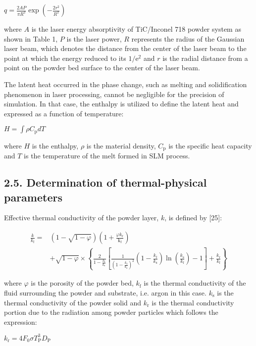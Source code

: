 \documentclass[10pt]{article}
\begin{document}
$q=\frac{2 A P}{\pi R^{2}} \exp \left(-\frac{2 r^{2}}{R^{2}}\right)$

where $A$ is the laser energy absorptivity of TiC/Inconel 718 powder system as shown in Table 1, $P$ is the laser power, $R$ represents the radius of the Gaussian laser beam, which denotes the distance from the center of the laser beam to the point at which the energy reduced to its $1 / \mathrm{e}^{2}$ and $r$ is the radial distance from a point on the powder bed surface to the center of the laser beam.

The latent heat occurred in the phase change, such as melting and solidification phenomenon in laser processing, cannot be negligible for the precision of simulation. In that case, the enthalpy is utilized to define the latent heat and expressed as a function of temperature:

$H=\int \rho C_{\mathrm{p}} d T$

where $H$ is the enthalpy, $\rho$ is the material density, $C_{\mathrm{p}}$ is the specific heat capacity and $T$ is the temperature of the melt formed in SLM process.

\subsection*{2.5. Determination of thermal-physical parameters}
Effective thermal conductivity of the powder layer, $k$, is defined by [25]:


\begin{align*}
\frac{k}{k_{\mathrm{f}}}= & (1-\sqrt{1-\varphi})\left(1+\frac{\varphi k_{\mathrm{r}}}{\mathrm{k}_{\mathrm{f}}}\right) \\
& +\sqrt{1-\varphi} \times\left\{\frac{2}{1-\frac{k_{\mathrm{f}}}{k_{\mathrm{s}}}}\left[\frac{1}{\left(1-\frac{k_{\mathrm{f}}}{k_{\mathrm{s}}}\right)^{2}}\left(1-\frac{k_{\mathrm{f}}}{k_{\mathrm{s}}}\right) \ln \left(\frac{k_{\mathrm{s}}}{k_{\mathrm{f}}}\right)-1\right]+\frac{k_{\mathrm{r}}}{k_{\mathrm{f}}}\right\} \tag{16}
\end{align*}


where $\varphi$ is the porosity of the powder bed, $k_{\mathrm{f}}$ is the thermal conductivity of the fluid surrounding the powder and substrate, i.e. argon in this case. $k_{\mathrm{s}}$ is the thermal conductivity of the powder solid and $k_{\mathrm{r}}$ is the thermal conductivity portion due to the radiation among powder particles which follows the expression:

$k_{\mathrm{r}}=4 F_{0} \sigma T_{\mathrm{P}}^{3} D_{\mathrm{P}}$
\end{document}
